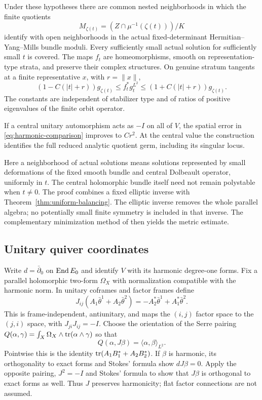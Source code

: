 \begin{theorem}\label{thm:harmonic-comparison}
Under these hypotheses there are common nested neighborhoods in
which the finite quotients
\[
 M_{\zeta(t)}=(Z\cap\mu^{-1}(\zeta(t)))/K
\]
identify with open neighborhoods in the actual fixed-determinant
Hermitian--Yang--Mills bundle moduli. Every sufficiently small actual
solution for sufficiently small $t$ is covered. The maps $f_t$ are
homeomorphisms, smooth on representation-type strata, and preserve
their complex structures. On genuine stratum tangents at a finite
representative $x$, with $r=\|x\|$,
\begin{equation}\label{eq:harmonic-comparison}
 (1-C(|t|+r))g_{\zeta(t)}
 \le f_t^*g_t^{L^2}
 \le(1+C(|t|+r))g_{\zeta(t)}.
\end{equation}
The constants are independent of stabilizer type and of ratios of
positive eigenvalues of the finite orbit operator.

If a central unitary automorphism acts as $-I$ on all of $V$, the
spatial error in \eqref{eq:harmonic-comparison} improves to $Cr^2$.
At the central value the construction identifies the full reduced
analytic quotient germ, including its singular locus.
\end{theorem}

Here a neighborhood of actual solutions means solutions represented
by small deformations of the fixed smooth bundle and central
Dolbeault operator, uniformly in $t$. The central holomorphic bundle
itself need not remain polystable when $t\ne0$.
The proof combines a fixed elliptic inverse with
Theorem~\ref{thm:uniform-balancing}. The elliptic inverse removes the
whole parallel algebra; no potentially small finite symmetry is
included in that inverse. The complementary minimization method
of \cite{Wue26b,Wue26c,Wue26d} then yields the metric estimate.

\subsection{Unitary quiver coordinates}
Write $d=\bar\partial_0$ on $\operatorname{End} E_0$ and identify $V$ with its
harmonic degree-one forms. Fix a parallel holomorphic two-form
$\Omega_X$ with normalization compatible with the harmonic norm.
In unitary coframes and factor frames define
\[
 J_{ij}(A_1\bar\theta^1+A_2\bar\theta^2)
       =-A_2^*\bar\theta^1+A_1^*\bar\theta^2.
\]
This is frame-independent, antiunitary, and maps the $(i,j)$ factor
space to the $(j,i)$ space, with $J_{ji}J_{ij}=-I$.
Choose the orientation of the Serre pairing
$Q(\alpha,\gamma)=\int_X\Omega_X\wedge\operatorname{tr}(\alpha\wedge\gamma)$
so that
\[
 Q(\alpha,J\beta)=\langle\alpha,\beta\rangle_{L^2}.
\]
Pointwise this is the identity
$\operatorname{tr}(A_1B_1^*+A_2B_2^*)$.
If $\beta$ is harmonic, its orthogonality to exact forms and Stokes'
formula show $dJ\beta=0$. Apply the opposite pairing, $J^2=-I$ and
Stokes' formula to show that $J\beta$ is orthogonal to exact forms
as well. Thus $J$ preserves harmonicity; flat factor connections
are not assumed.

